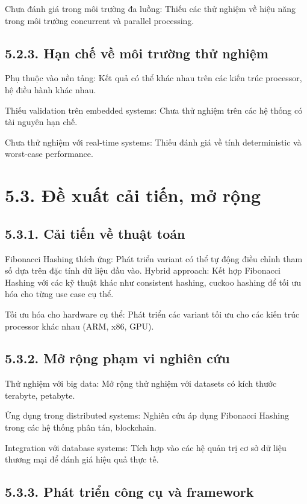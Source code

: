 \documentclass[12pt,a4paper]{report}
\begin{document}
Chưa đánh giá trong môi trường đa luồng: Thiếu các thử nghiệm về hiệu năng trong môi trường concurrent và parallel processing.

\subsection*{5.2.3. Hạn chế về môi trường thử nghiệm}
\noindent \indent Phụ thuộc vào nền tảng: Kết quả có thể khác nhau trên các kiến trúc processor, hệ điều hành khác nhau.

Thiếu validation trên embedded systems: Chưa thử nghiệm trên các hệ thống có tài nguyên hạn chế.

Chưa thử nghiệm với real-time systems: Thiếu đánh giá về tính deterministic và worst-case performance.
\section*{5.3. Đề xuất cải tiến, mở rộng}
\subsection*{5.3.1. Cải tiến về thuật toán}

\noindent \indent Fibonacci Hashing thích ứng: Phát triển variant có thể tự động điều chỉnh tham số dựa trên đặc tính dữ liệu đầu vào.
Hybrid approach: Kết hợp Fibonacci Hashing với các kỹ thuật khác như consistent hashing, cuckoo hashing để tối ưu hóa cho từng use case cụ thể.

Tối ưu hóa cho hardware cụ thể: Phát triển các variant tối ưu cho các kiến trúc processor khác nhau (ARM, x86, GPU).

\subsection*{5.3.2. Mở rộng phạm vi nghiên cứu}

\noindent \indent Thử nghiệm với big data: Mở rộng thử nghiệm với datasets có kích thước terabyte, petabyte.

Ứng dụng trong distributed systems: Nghiên cứu áp dụng Fibonacci Hashing trong các hệ thống phân tán, blockchain.

Integration với database systems: Tích hợp vào các hệ quản trị cơ sở dữ liệu thương mại để đánh giá hiệu quả thực tế.

\subsection*{5.3.3. Phát triển công cụ và framework}
\end{document}
